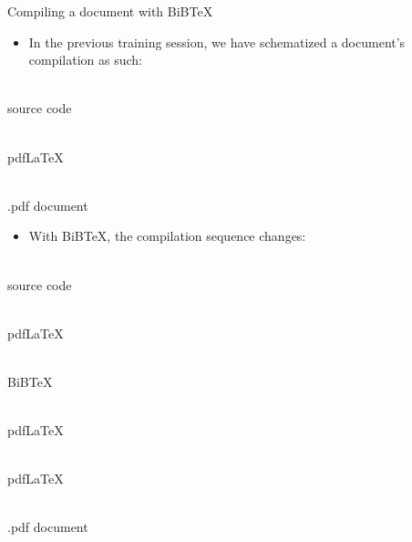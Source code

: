 \begin{frame}[c]{Compiling a document with BiB\TeX}
	\begin{itemize}
		\item In the previous training session, we have schematized a document's compilation as such:
	\end{itemize}
	{
		\begin{minipage}[t]{0.25\linewidth}
			\centering
			{\Large\faFileTextO} \\
			source code
		\end{minipage}
		\hfill{\Large\faArrowRight}\hfill
		\begin{minipage}[t]{0.25\linewidth}
			\centering
			{\Large\faCogs} \\
			pdf\LaTeX
		\end{minipage}
		\hfill{\Large\faArrowRight}\hfill
		\begin{minipage}[t]{0.25\linewidth}
			\centering
			{\Large\faFilePdfO} \\
			.pdf document
		\end{minipage}
	}
	
	\pause
	
	\begin{itemize}
		\item With BiB\TeX, the compilation sequence changes:		
	\end{itemize}

	{
		\begin{minipage}[t]{0.125\linewidth}
			\centering
			{\Large\faFileTextO} \\
			source code
		\end{minipage}
		\hfill{\Large\faArrowRight}\hfill
		\begin{minipage}[t]{0.125\linewidth}
			\centering
			{\Large\faCogs} \\
			pdf\LaTeX
		\end{minipage}
		\hfill{\Large\faArrowRight}\hfill
		\begin{minipage}[t]{0.125\linewidth}
			\centering
			{\Large\faCogs} \\
			BiB\TeX
		\end{minipage}
		\hfill{\Large\faArrowRight}\hfill
		\begin{minipage}[t]{0.125\linewidth}
			\centering
			{\Large\faCogs} \\
			pdf\LaTeX
		\end{minipage}
		\hfill{\Large\faArrowRight}\hfill
		\begin{minipage}[t]{0.125\linewidth}
			\centering
			{\Large\faCogs} \\
			pdf\LaTeX
		\end{minipage}
		\hfill{\Large\faArrowRight}\hfill
		\begin{minipage}[t]{0.125\linewidth}
			\centering
			{\Large\faFilePdfO} \\
			.pdf document
		\end{minipage}
	}
\end{frame}

